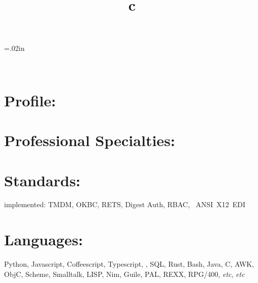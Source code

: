 \documentclass[line,margin,hidelinks]{res}
\begin{document}
\def\resOrCvLink{
  \href{\cvUrl}{full CV}}


\resumewidth=7.2in
\begin{resume}

\end{resume}

\sectionskip=.02in

\begin{format}
\title{c}\\
\end{format}


\section{Profile:
  \maybemugshot
}

\section{Professional Specialties:}

\section{Standards:}
\begin{par}
implemented:
TMDM,
OKBC,
RETS,
Digest Auth,
RBAC,
~ANSI~X12~EDI
\end{par}

\section{Languages:}
\begin{par}
  Python, Javascript, Coffeescript, Typescript, \PS, SQL, Rust, Bash,
  Java, C, AWK, ObjC, Scheme, Smalltalk, LISP, Nim, Guile, PAL, REXX, RPG/400,
  \textit{etc}, \textit{etc}
\end{par}
\end{document}
